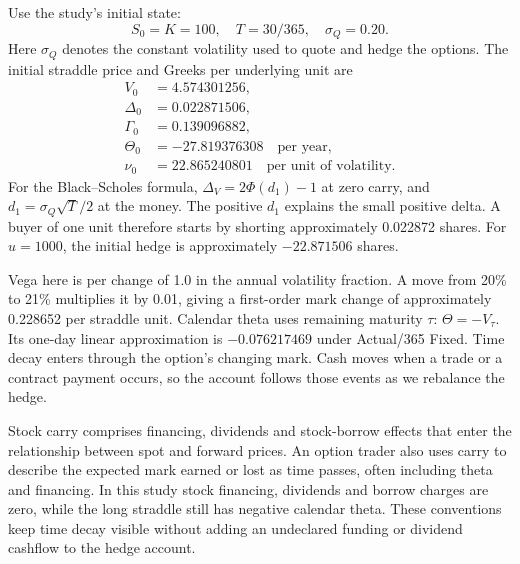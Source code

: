\documentclass[8pt]{strategynet-journal}
\begin{document}
\begin{SNcolumns}
Use the study's initial state:
\[
 S_0=K=100,\quad T=30/365,\quad \sigma_Q=0.20.
\]
Here $\sigma_Q $ denotes the constant volatility used to quote and hedge the
options. The initial straddle price and Greeks per underlying unit are
\begin{align*}
 V_0&=4.574301256,\\
 \Delta_0&=0.022871506,\\
 \Gamma_0&=0.139096882,\\
 \Theta_0&=-27.819376308\quad\text{per year},\\
 \nu_0&=22.865240801\quad\text{per unit of volatility}.
\end{align*}
For the Black--Scholes formula, $\Delta_V=2\Phi(d_1)-1$ at zero carry, and
$d_1=\sigma_Q\sqrt T/2$ at the money. The positive $d_1$ explains the small
positive delta. A buyer of one unit therefore starts by shorting approximately
0.022872 shares. For $u=1000$, the initial hedge is approximately $-22.871506$
shares.

Vega here is per change of 1.0 in the annual volatility fraction. A move from 20\%
to 21\% multiplies it by 0.01, giving a first-order mark change of approximately
0.228652 per straddle unit. Calendar theta uses remaining maturity $\tau $:
$\Theta=-V_\tau $. Its one-day linear approximation is $-0.076217469$ under
Actual/365 Fixed. Time decay enters through the option's changing mark. Cash
moves when a trade or a contract payment occurs, so the account follows those
events as we rebalance the hedge.

Stock carry comprises financing, dividends and stock-borrow effects that enter
the relationship between spot and forward prices. An option trader also uses
carry to describe the expected mark earned or lost as time passes, often
including theta and financing. In this study stock financing, dividends and
borrow charges are zero, while the long straddle still has negative calendar
theta. These conventions keep time decay visible without adding an undeclared
funding or dividend cashflow to the hedge account.


\end{SNcolumns}
\end{document}
